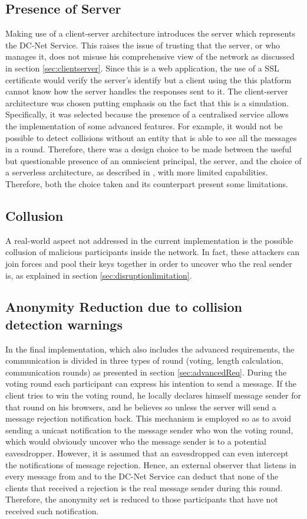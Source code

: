 \subsection{Presence of Server} \label{sec:evalServerPresence}
Making use of a client-server architecture introduces the server which represents the DC-Net Service. This raises the issue of trusting that the server, or who manages it, does not misuse his comprehensive view of the network as discussed in section \ref{sec:clientserver}. Since this is a web application, the use of a SSL certificate would verify the server's identify but a client using the this platform cannot know how the server handles the responses sent to it. The client-server architecture was chosen putting emphasis on the fact that this is a simulation. Specifically, it was selected because the presence of a centralised service allows the implementation of some advanced features. For example, it would not be possible to detect collisions without an entity that is able to see all the messages in a round. Therefore, there was a design choice to be made between the useful but questionable presence of an omniscient principal, the server, and the choice of a serverless architecture, as described in \cite{Scholz}, with more limited capabilities. Therefore, both the choice taken and its counterpart present some limitations.

\subsection{Collusion}
A real-world aspect not addressed in the current implementation is the possible collusion of malicious participants inside the network. In fact, these attackers can join forces and pool their keys together in order to uncover who the real sender is, as explained in section \ref{sec:disruptionlimitation}.

\subsection{Anonymity Reduction due to collision detection warnings} \label{sec:anonymityReductionLimitation}
In the final implementation, which also includes the advanced requirements, the communication is divided in three types of round (voting, length calculation, communication rounds) as presented in section \ref{sec:advancedReq}. During the voting round each participant can express his intention to send a message. If the client tries to win the voting round, he locally declares himself message sender for that round on his browsers, and he believes so unless the server will send a message rejection notification back. This mechanism is employed so as to avoid sending a unicast notification to the message sender who won the voting round, which would obviously uncover who the message sender is to a potential eavesdropper. However, it is assumed that an eavesdropped can even intercept the notifications of message rejection. Hence, an external observer that listens in every message from and to the DC-Net Service can deduct that none of the clients that received a rejection is the real message sender during this round. Therefore, the anonymity set is reduced to those participants that have not received such notification.

